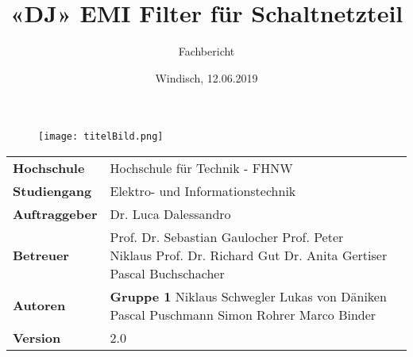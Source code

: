 \documentclass[final]{fhnwreport}       %
\title{«DJ» EMI Filter für Schaltnetzteil}          			%
\author{Fachbericht}  		%
\date{Windisch, 12.06.2019}             		%
\begin{document}
\maketitle

\vspace*{-1cm}						    %
\vfill
\begin{figure}[H]
\centering
\texttt{[image: titelBild.png]}
\end{figure}
\vfill

{
\renewcommand\arraystretch{2}
\begin{center}
\begin{tabular}{ >{\bf} l p{10cm} l }
Hochschule&Hochschule für Technik - FHNW\\
Studiengang&Elektro- und Informationstechnik\\
Auftraggeber&Dr. Luca Dalessandro\\
Betreuer&Prof. Dr. Sebastian Gaulocher \newline Prof. Peter Niklaus \newline Prof. Dr. Richard Gut \newline  Dr. Anita Gertiser \newline Pascal Buchschacher \\
Autoren&\textbf{Gruppe 1} \newline Niklaus Schwegler \newline Lukas von Däniken \newline Pascal Puschmann  \newline Simon Rohrer \newline Marco Binder\\
Version&2.0 %
\end{tabular}
\end{center}
}

\clearpage

			
\end{document}
